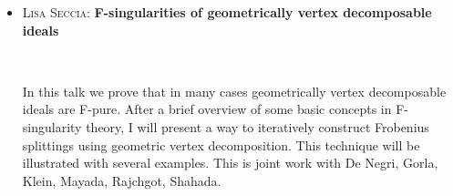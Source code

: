 \documentclass[12pt]{amsart}
\begin{document}
\begin{itemize}
\vfill


\item \textsc{Lisa Seccia:} \textbf{F-singularities of geometrically vertex decomposable ideals}

\

\noindent In this talk we prove that in many cases geometrically vertex decomposable ideals are F-pure. After a brief overview of some basic concepts in F-singularity theory, I will present a way to iteratively construct Frobenius splittings using geometric vertex decomposition. This technique will be illustrated with several examples.
 This is joint work with De Negri, Gorla, Klein, Mayada, Rajchgot, Shahada.

\vfill

\end{itemize}

\vfill
\end{document}
